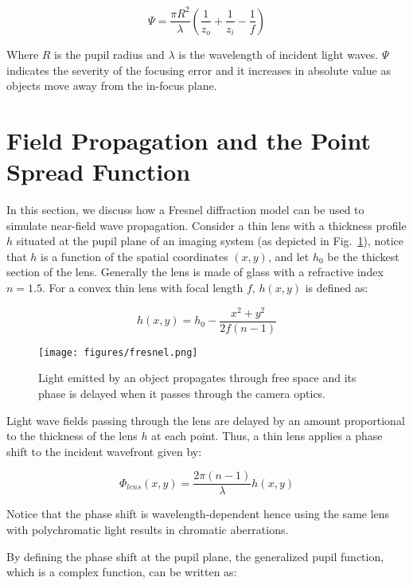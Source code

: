 \documentclass[preprint,5p,twocolumn]{elsarticle}
\begin{document}
\begin{equation}
    \Psi= \frac{\pi R^2}{\lambda}(\frac{1}{z_{o}}+\frac{1}{z_{i}} - \frac{1}{f})
\end{equation}

Where $R$ is the pupil radius and $\lambda$ is the wavelength of incident light waves. $\Psi$ indicates the severity of the focusing error and it increases in absolute value as objects move away from the in-focus plane.



\section{Field Propagation and the Point Spread Function}
\label{sec:fp}
In this section, we discuss how a Fresnel diffraction model can be used to simulate near-field wave propagation.
Consider a  thin lens with a thickness profile $h$ situated at the pupil plane of an imaging system (as depicted in Fig.~\ref{fig:fresnel}), notice that $h$ is a function of the  spatial coordinates $(x,y)$, and let $h_{0}$ be the thickest section of the lens. Generally the lens is made of glass with a refractive index $n=1.5$. For a convex thin lens with focal length $f$, $h(x,y)$ is  defined as:

\begin{equation}
  h(x,y)=h_{0}-\frac{x^2+y^2}{2f(n-1)}
\end{equation}

\begin{figure}[htp]
\centering
\texttt{[image: figures/fresnel.png]}
\caption{Light emitted by an object propagates through free space and its phase is delayed when it passes through the camera optics.}
\label{fig:fresnel}
\end{figure}

Light wave fields passing through the lens are delayed by an amount proportional to the thickness of the lens $h$ at each point. Thus, a thin lens applies a phase shift to the incident wavefront given by:

\begin{equation}
\label{1.11}
  \Phi_{lens}(x,y)=\frac{2\pi (n-1)}{\lambda}h(x,y)  
\end{equation}

Notice that the phase shift is wavelength-dependent hence using the same lens with polychromatic light results in chromatic aberrations.



By defining the phase shift at the pupil plane, the generalized pupil function, which is a complex function, can be written as:
\end{document}
